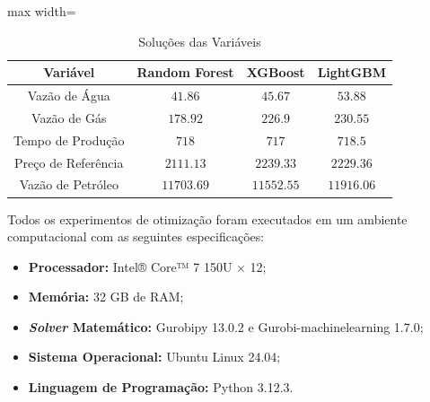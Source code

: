 \begin{table}[]
    \centering
    \captionsetup{justification=centering}
    \caption{Soluções das Variáveis}
    \label{tab:resultado_gurobi}
    \small 
    \setlength{\tabcolsep}{3pt} %
    \begin{adjustbox}{max width=\textwidth}
    \begin{tabular}{cccc}
        \toprule
        Variável & Random Forest & XGBoost & LightGBM \\
        \midrule
        Vazão de Água & $41.86$ & $45.67$ & $53.88$ \\
        Vazão de Gás & $178.92$ & $226.9$ & $230.55$ \\
        Tempo de Produção & $718$ & $717$ & $718.5$ \\
        Preço de Referência & $2111.13$ & $2239.33$ & $2229.36$ \\
        \midrule
        Vazão de Petróleo & $11703.69$ & $11552.55$ & $11916.06$ \\
        \bottomrule
    \end{tabular}
    \end{adjustbox}
\end{table}

Todos os experimentos de otimização foram executados em um ambiente computacional com as seguintes especificações:

\begin{itemize}
    \item \textbf{Processador:} Intel® Core™ 7 150U × 12;
    \item \textbf{Memória:} 32 GB de RAM;
    \item \textbf{\textit{Solver} Matemático:} Gurobipy 13.0.2 e Gurobi-machinelearning 1.7.0;
    \item \textbf{Sistema Operacional:} Ubuntu Linux 24.04;
    \item \textbf{Linguagem de Programação:} Python 3.12.3.
\end{itemize}
